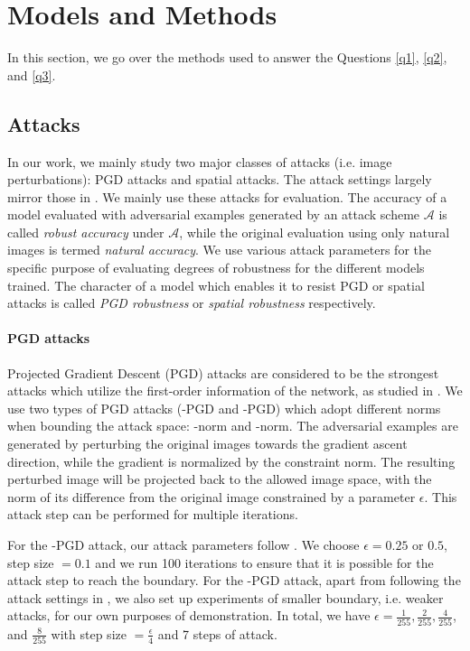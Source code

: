 \section{Models and Methods}

In this section, we go over the methods used to answer the Questions \ref{q1}, \ref{q2}, and \ref{q3}.

\subsection{Attacks} \label{sec:attacks}
In our work, we mainly study two major classes of attacks (i.e. image perturbations): PGD attacks and spatial 
attacks. The attack settings largely mirror those in \cite{Ilyas2019, engstrom2019a}. We mainly use these attacks for evaluation. The accuracy of a model evaluated with adversarial examples generated by an attack scheme $\mathcal{A}$ is called \textit{robust accuracy} under $\mathcal{A}$, while the original evaluation using only natural images is termed \textit{natural accuracy}. We use various attack parameters for the specific purpose of evaluating degrees of robustness for the different models trained. The character of a model which enables it to resist PGD or spatial attacks is called \textit{PGD robustness} or \textit{spatial robustness} respectively.

\paragraph{PGD attacks} Projected Gradient Descent (PGD) attacks are considered to be the strongest attacks which utilize the first-order information of the network, as studied in \cite{Madry18}. We use two types of PGD attacks (\ltwo-PGD and \linf-PGD) which adopt different norms when bounding the attack space: \ltwo-norm and \linf-norm. The adversarial examples are generated by perturbing the original images towards the gradient ascent direction, while the gradient is normalized by the constraint norm. The resulting perturbed image will be projected back to the allowed image space, with the norm of its difference from the original image constrained by a parameter $\epsilon$. This attack step can be performed for multiple iterations.

For the \ltwo-PGD attack, our attack parameters follow \cite{Ilyas2019}. We choose $\epsilon=0.25$ or $0.5$, step size $=0.1$ and we run 100 iterations to ensure that it is possible for the attack step to reach the boundary. For the \linf-PGD attack, apart from following the attack settings in \cite{Madry18}, we also set up experiments of smaller \linf boundary, i.e. weaker attacks, for our own purposes of demonstration. In total, we have $\epsilon = \frac{1}{255}, \frac{2}{255}, \frac{4}{255}$, and $\frac{8}{255}$ with step size $=\frac{\epsilon}{4}$ and 7 steps of attack. 

